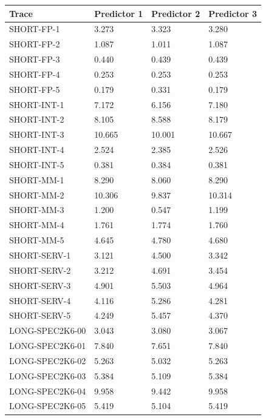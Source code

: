 \documentclass{article}
\begin{document}
\begin{table}[h]
    \centering
    \begin{tabular}{llll}
        \toprule
        \textbf{Trace} & \textbf{Predictor 1} & \textbf{Predictor 2} & \textbf{Predictor 3} \\        
        \midrule
        SHORT-FP-1  & 3.273 & 3.323 & 3.280 \\
        SHORT-FP-2  & 1.087 & 1.011 & 1.087 \\
        SHORT-FP-3  & 0.440 & 0.439 & 0.439 \\
        SHORT-FP-4  & 0.253 & 0.253 & 0.253 \\
        SHORT-FP-5  & 0.179 & 0.331 & 0.179 \\
        SHORT-INT-1  & 7.172 & 6.156 & 7.180 \\
        SHORT-INT-2  & 8.105 & 8.588 & 8.179 \\
        SHORT-INT-3  & 10.665 & 10.001 & 10.667 \\
        SHORT-INT-4  & 2.524 & 2.385 & 2.526 \\
        SHORT-INT-5  & 0.381 & 0.384 & 0.381 \\
        SHORT-MM-1  & 8.290 & 8.060 & 8.290 \\
        SHORT-MM-2  & 10.306 & 9.837 & 10.314 \\
        SHORT-MM-3  & 1.200 & 0.547 & 1.199 \\
        SHORT-MM-4  & 1.761 & 1.774 & 1.760 \\
        SHORT-MM-5  & 4.645 & 4.780 & 4.680 \\
        SHORT-SERV-1  & 3.121 & 4.500 & 3.342 \\
        SHORT-SERV-2  & 3.212 & 4.691 & 3.454 \\
        SHORT-SERV-3  & 4.901 & 5.503 & 4.964 \\
        SHORT-SERV-4  & 4.116 & 5.286 & 4.281 \\
        SHORT-SERV-5  & 4.249 & 5.457 & 4.370 \\
        LONG-SPEC2K6-00  & 3.043 & 3.080 & 3.067 \\
        LONG-SPEC2K6-01  & 7.840 & 7.651 & 7.840 \\
        LONG-SPEC2K6-02  & 5.263 & 5.032 & 5.263 \\
        LONG-SPEC2K6-03  & 5.384 & 5.109 & 5.384 \\
        LONG-SPEC2K6-04  & 9.958 & 9.442 & 9.958 \\
        LONG-SPEC2K6-05  & 5.419 & 5.104 & 5.419 \\

\end{tabular}
\end{table}
\end{document}
